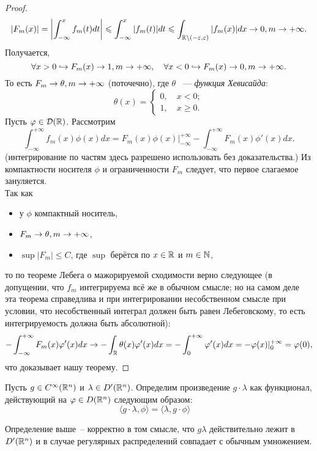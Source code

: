 \begin{proof}
    \[
        |F_m(x)| = \left|\int_{-\infty}^x f_m(t)dt\right| \leqslant \int_{-\infty}^x |f_m(t)|dt \leqslant \int_{\mathbb{R} \setminus (-\varepsilon, \varepsilon)} |f_m(x)|dx \rightarrow 0, m \rightarrow +\infty.
    \]
    Получается,
    \[
        \forall x > 0 \hookrightarrow F_m(x) \rightarrow 1, m \rightarrow +\infty, \quad \forall x < 0 \hookrightarrow F_m(x) \rightarrow 0, m \rightarrow +\infty.
    \]
    То есть $F_m \rightarrow \theta, m \rightarrow +\infty$ (поточечно), где $\theta$ ~--- \textit{функция Хевисайда}:
    \[
        \theta(x) = \begin{cases}
                        0,\quad x < 0; \\
                        1,\quad x \geq 0.
        \end{cases}
    \]
    Пусть $\varphi \in \mathcal{D}(\mathbb{R})$. Рассмотрим
    \[
        \int_{-\infty}^{+\infty} f_m(x)\phi(x)dx = F_m(x)\phi(x)\bigg|^{+\infty}_{-\infty} - \int_{-\infty}^{+\infty} F_m(x)\phi'(x)dx.
    \]
    (интегрирование по частям здесь разрешено использовать без доказательства.)
    Из компактности носителя $\phi$ и ограниченности $F_m$ следует, что первое слагаемое зануляется.\\
    Так как
    \begin{itemize}
        \item у $\phi$ компактный носитель,
        \item $F_m \rightarrow \theta, m \rightarrow +\infty$,
        \item $\sup |F_m| \leq C$, где $\sup$ берётся по $x\in \mathbb{R}$ и $m \in \mathbb{N}$,
    \end{itemize}
    то по теореме Лебега о мажорируемой сходимости верно следующее (в допущении, что $f_m$ интегрируема всё же в обычном смысле; но на самом деле эта теорема справедлива и при интегрировании несобственном смысле при условии, что несобственный интеграл должен быть равен Лебеговскому, то есть интегрируемость должна быть абсолютной):
    \[
        -\int_{-\infty}^{+\infty} F_m(x)\varphi'(x)dx \rightarrow -\int_{\mathbb{R}} \theta(x)\varphi'(x)dx = -\int_0^{+\infty} \varphi'(x)dx = -\varphi(x)|^{+\infty}_0 = \varphi(0),
    \]
    что доказывает нашу теорему.
\end{proof}
\begin{definition}
    Пусть $g \in C^{\infty}(\mathbb{R}^n)$ и $\lambda \in D'(\mathbb{R}^n)$.
    Определим произведение $g\cdot\lambda$ как функционал, действующий на $\varphi \in D(\mathbb{R}^n)$ следующим образом:
    \[
        \langle g \cdot \lambda, \phi \rangle = \langle \lambda, g \cdot \phi \rangle \quad \tag{$\ast$}
    \]
\end{definition}
\begin{theorem}
    Определение выше~-- корректно в том смысле, что $g\lambda$ действительно лежит в $D'(\mathbb{R}^n)$ и в случае регулярных распределений совпадает с обычным умножением.
\end{theorem}
